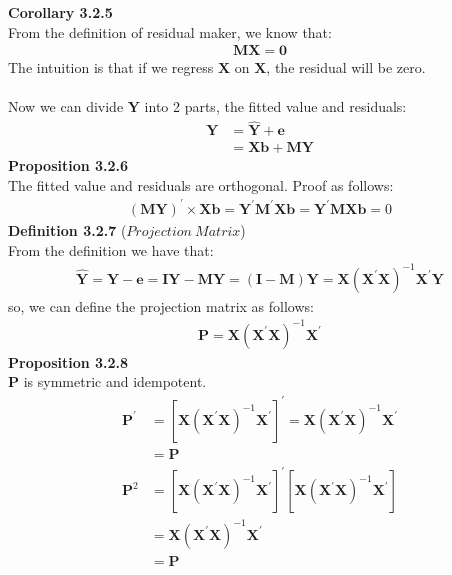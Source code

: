 \documentclass{article}
\begin{document}
\textbf{Corollary 3.2.5}\\
From the definition of residual maker, we know that:
	\begin{align*}
		\boldsymbol{M} \boldsymbol{X} = \boldsymbol{0}
	\end{align*}
The intuition is that if we regress $\boldsymbol{X}$ on $\boldsymbol{X}$, the residual will be zero.\\\\
Now we can divide $\boldsymbol{Y}$ into 2 parts, the fitted value and residuals:
	\begin{align*}
		\boldsymbol{Y} &= \hat{\boldsymbol{Y}} + \boldsymbol{e}\\
		&= \boldsymbol{X} \boldsymbol{b} + \boldsymbol{M} \boldsymbol{Y}
	\end{align*}
\textbf{Proposition 3.2.6}\\
The fitted value and residuals are orthogonal. Proof as follows:
	\begin{align*}
		(\boldsymbol{M} \boldsymbol{Y})^\prime \times \boldsymbol{X} \boldsymbol{b} = \boldsymbol{Y}^\prime \boldsymbol{M}^\prime \boldsymbol{X} \boldsymbol{b} = \boldsymbol{Y}^\prime \boldsymbol{M} \boldsymbol{X} \boldsymbol{b} = 0
	\end{align*}
\textbf{Definition 3.2.7} ($Projection\ Matrix$)\\
From the definition we have that:
	\begin{align*}
		\hat{\boldsymbol{Y}} = \boldsymbol{Y} - \boldsymbol{e} = \boldsymbol{I} \boldsymbol{Y} - \boldsymbol{M} \boldsymbol{Y} = (\boldsymbol{I} - \boldsymbol{M}) \boldsymbol{Y} = \boldsymbol{X} (\boldsymbol{X}^\prime \boldsymbol{X})^{-1} \boldsymbol{X}^\prime \boldsymbol{Y} 
	\end{align*}
so, we can define the projection matrix as follows:
	\begin{align*}
		\boldsymbol{P} = \boldsymbol{X} (\boldsymbol{X}^\prime \boldsymbol{X})^{-1} \boldsymbol{X}^\prime
	\end{align*}
\textbf{Proposition 3.2.8}\\
$\boldsymbol{P}$ is symmetric and idempotent.
	\begin{align*}
		\boldsymbol{P}^\prime &= [\boldsymbol{X} (\boldsymbol{X}^\prime \boldsymbol{X})^{-1} \boldsymbol{X}^\prime]^\prime = \boldsymbol{X} (\boldsymbol{X}^\prime \boldsymbol{X})^{-1} \boldsymbol{X}^\prime\\
		&= \boldsymbol{P}\\
		\boldsymbol{P}^2 &= [\boldsymbol{X} (\boldsymbol{X}^\prime \boldsymbol{X})^{-1} \boldsymbol{X}^\prime]^\prime [\boldsymbol{X} (\boldsymbol{X}^\prime \boldsymbol{X})^{-1} \boldsymbol{X}^\prime]\\
		&= \boldsymbol{X} (\boldsymbol{X}^\prime \boldsymbol{X})^{-1} \boldsymbol{X}^\prime\\
		&= \boldsymbol{P}
	\end{align*}
\end{document}
